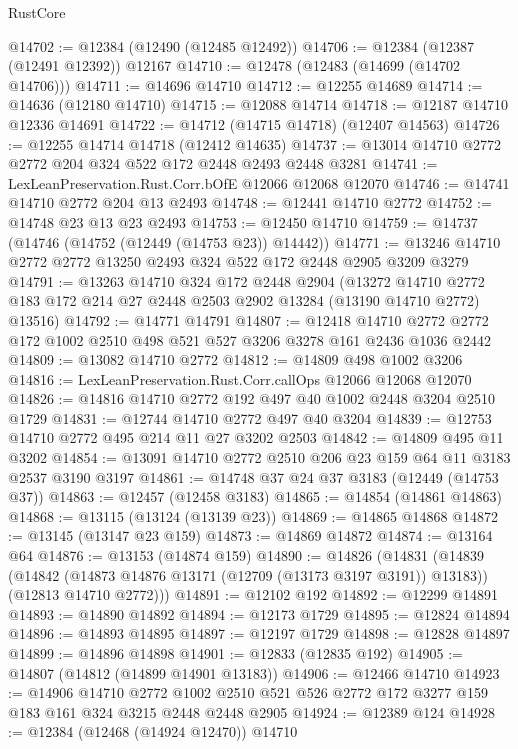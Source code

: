 \begin{lexlean}{RustCore}
\begin{coremodule}
@14702 := @12384 (@12490 (@12485 @12492))
@14706 := @12384 (@12387 (@12491 @12392)) @12167
@14710 := @12478 (@12483 (@14699 (@14702 @14706)))
@14711 := @14696 @14710
@14712 := @12255 @14689
@14714 := @14636 (@12180 @14710)
@14715 := @12088 @14714
@14718 := @12187 @14710 @12336 @14691
@14722 := @14712 (@14715 @14718) (@12407 @14563)
@14726 := @12255 @14714 @14718 (@12412 @14635)
@14737 := @13014 @14710 @2772 @2772 @204 @324 @522 @172 @2448 @2493 @2448 @3281
@14741 := LexLeanPreservation.Rust.Corr.bOfE @12066 @12068 @12070
@14746 := @14741 @14710 @2772 @204 @13 @2493
@14748 := @12441 @14710 @2772
@14752 := @14748 @23 @13 @23 @2493
@14753 := @12450 @14710
@14759 := @14737 (@14746 (@14752 (@12449 (@14753 @23)) @14442))
@14771 := @13246 @14710 @2772 @2772 @13250 @2493 @324 @522 @172 @2448 @2905 @3209 @3279
@14791 := @13263
    @14710
    @324
    @172
    @2448
    @2904
    (@13272 @14710 @2772 @183 @172 @214 @27 @2448 @2503 @2902 @13284 (@13190 @14710 @2772) @13516)
@14792 := @14771 @14791
@14807 := @12418
    @14710
    @2772
    @2772
    @172
    @1002
    @2510
    @498
    @521
    @527
    @3206
    @3278
    @161
    @2436
    @1036
    @2442
@14809 := @13082 @14710 @2772
@14812 := @14809 @498 @1002 @3206
@14816 := LexLeanPreservation.Rust.Corr.callOps @12066 @12068 @12070
@14826 := @14816 @14710 @2772 @192 @497 @40 @1002 @2448 @3204 @2510 @1729
@14831 := @12744 @14710 @2772 @497 @40 @3204
@14839 := @12753 @14710 @2772 @495 @214 @11 @27 @3202 @2503
@14842 := @14809 @495 @11 @3202
@14854 := @13091 @14710 @2772 @2510 @206 @23 @159 @64 @11 @3183 @2537 @3190 @3197
@14861 := @14748 @37 @24 @37 @3183 (@12449 (@14753 @37))
@14863 := @12457 (@12458 @3183)
@14865 := @14854 (@14861 @14863)
@14868 := @13115 (@13124 (@13139 @23))
@14869 := @14865 @14868
@14872 := @13145 (@13147 @23 @159)
@14873 := @14869 @14872
@14874 := @13164 @64
@14876 := @13153 (@14874 @159)
@14890 := @14826
    (@14831
      (@14839
        (@14842 (@14873 @14876 @13171 (@12709 (@13173 @3197 @3191)) @13183))
        (@12813 @14710 @2772)))
@14891 := @12102 @192
@14892 := @12299 @14891
@14893 := @14890 @14892
@14894 := @12173 @1729
@14895 := @12824 @14894
@14896 := @14893 @14895
@14897 := @12197 @1729
@14898 := @12828 @14897
@14899 := @14896 @14898
@14901 := @12833 (@12835 @192)
@14905 := @14807 (@14812 (@14899 @14901 @13183))
@14906 := @12466 @14710
@14923 := @14906
    @14710
    @2772
    @1002
    @2510
    @521
    @526
    @2772
    @172
    @3277
    @159
    @183
    @161
    @324
    @3215
    @2448
    @2448
    @2905
@14924 := @12389 @124
@14928 := @12384 (@12468 (@14924 @12470)) @14710

\end{coremodule}
\end{lexlean}
